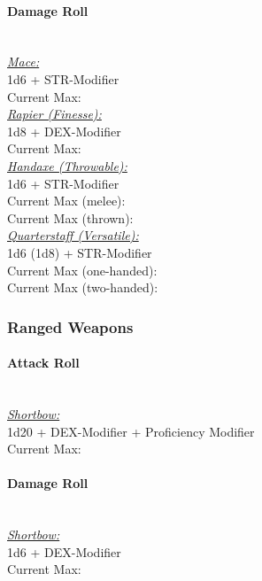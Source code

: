 \documentclass[letterpaper,openany,oneside,twocolumn]{book}
\begin{document}
\paragraph*{Damage Roll}\hfill\\
\underline{\textit{Mace:}}\\
1d6 + STR-Modifier\\
\indent Current Max: 
\\
\underline{\textit{Rapier (Finesse):}}\\
1d8 + DEX-Modifier\\
\indent Current Max: 
\\
\underline{\textit{Handaxe (Throwable):}}\\
1d6 + STR-Modifier\\
\indent Current Max (melee): \\
\indent Current Max (thrown): 
\\
\underline{\textit{Quarterstaff (Versatile):}}\\
1d6 (1d8) + STR-Modifier\\
\indent Current Max (one-handed): \\
\indent Current Max (two-handed): 
\subsubsection*{Ranged Weapons}
\paragraph*{Attack Roll}\hfill\\
\underline{\textit{Shortbow:}}\\
1d20 + DEX-Modifier + Proficiency Modifier\\
\indent Current Max: 
\paragraph*{Damage Roll}\hfill\\
\underline{\textit{Shortbow:}}\\
1d6 + DEX-Modifier\\
\indent Current Max: 
\end{document}
